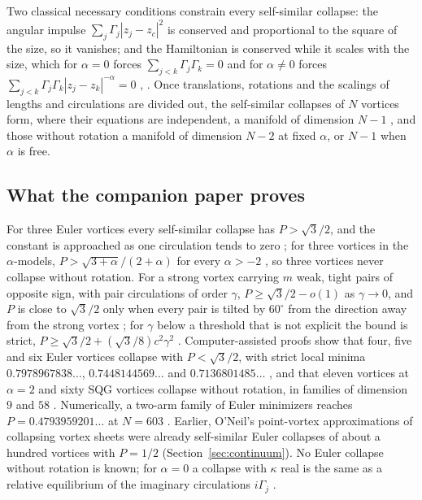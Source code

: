\documentclass[11pt]{article}
\theoremstyle{definition}
\begin{document}
Two classical necessary conditions constrain every self-similar collapse: the angular impulse $\sum_j \Gamma_j |z_j - z_c|^2$ is conserved and proportional to the square of the size, so it vanishes; and the Hamiltonian is conserved while it scales with the size, which for $\alpha = 0$ forces $\sum_{j<k} \Gamma_j\Gamma_k = 0$ and for $\alpha \ne 0$ forces $\sum_{j<k} \Gamma_j\Gamma_k |z_j - z_k|^{-\alpha} = 0$ \cite[Sect.~2, Lemma~1, Sect.~7]{mw2026}, \cite{dk2014}. Once translations, rotations and the scalings of lengths and circulations are divided out, the self-similar collapses of $N$ vortices form, where their equations are independent, a manifold of dimension $N - 1$ \cite[Sect.~7]{mw2026}, and those without rotation a manifold of dimension $N - 2$ at fixed $\alpha$, or $N - 1$ when $\alpha$ is free.

\subsection{What the companion paper proves}

For three Euler vortices every self-similar collapse has $P > \sqrt{3}/2$, and the constant is approached as one circulation tends to zero \cite[Theorem~1, Corollary~1]{mw2026}; for three vortices in the $\alpha$-models, $P > \sqrt{3 + \alpha}/(2 + \alpha)$ for every $\alpha > -2$ \cite[Theorem~2]{mw2026}, so three vortices never collapse without rotation. For a strong vortex carrying $m$ weak, tight pairs of opposite sign, with pair circulations of order $\gamma$, $P \ge \sqrt{3}/2 - o(1)$ as $\gamma \to 0$, and $P$ is close to $\sqrt{3}/2$ only when every pair is tilted by $60^\circ$ from the direction away from the strong vortex \cite[Theorem~3]{mw2026}; for $\gamma$ below a threshold that is not explicit the bound is strict, $P \ge \sqrt{3}/2 + (\sqrt{3}/8)c^2\gamma^2$ \cite[Proposition~4]{mw2026}. Computer-assisted proofs show that four, five and six Euler vortices collapse with $P < \sqrt{3}/2$, with strict local minima $0.7978967838\ldots$, $0.7448144569\ldots$ and $0.7136801485\ldots$ \cite[Theorem~4]{mw2026}, and that eleven vortices at $\alpha = 2$ and sixty SQG vortices collapse without rotation, in families of dimension $9$ and $58$ \cite[Theorem~5]{mw2026}. Numerically, a two-arm family of Euler minimizers reaches $P = 0.4793959201\ldots$ at $N = 603$ \cite[Sect.~7]{mw2026}. Earlier, O'Neil's point-vortex approximations of collapsing vortex sheets \cite[Fig.~3]{oneil2010} were already self-similar Euler collapses of about a hundred vortices with $P = 1/2$ (Section~\ref{sec:continuum}). No Euler collapse without rotation is known; for $\alpha = 0$ a collapse with $\kappa$ real is the same as a relative equilibrium of the imaginary circulations $i\Gamma_j$ \cite[Sect.~10]{mw2026}.
\end{document}
